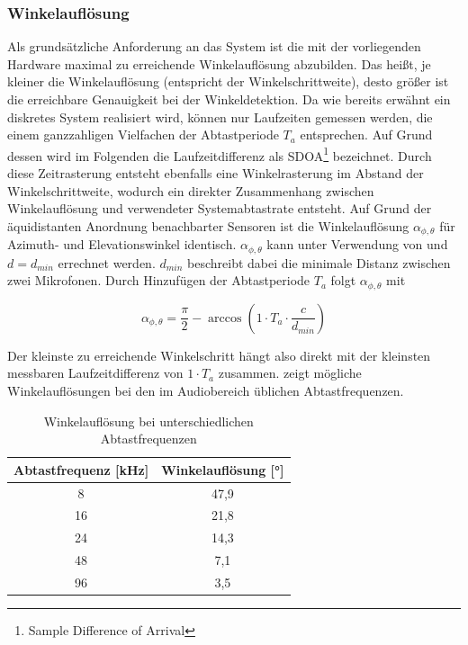\subsubsection{Winkelauflösung}
\label{subsubsec:Winkelaufloesung}
Als grundsätzliche Anforderung an das System ist die mit der vorliegenden Hardware maximal zu erreichende Winkelauflösung abzubilden. Das heißt, je kleiner die Winkelauflösung (entspricht der Winkelschrittweite), desto größer ist die erreichbare Genauigkeit bei der Winkeldetektion. Da wie bereits erwähnt ein diskretes System realisiert wird, können nur Laufzeiten gemessen werden, die einem ganzzahligen Vielfachen der Abtastperiode $T_a$ entsprechen. Auf Grund dessen wird im Folgenden die Laufzeitdifferenz als SDOA\footnote{Sample Difference of Arrival} bezeichnet. Durch diese Zeitrasterung entsteht ebenfalls eine Winkelrasterung im Abstand der Winkelschrittweite, wodurch ein direkter Zusammenhang zwischen Winkelauflösung und verwendeter Systemabtastrate entsteht. Auf Grund der äquidistanten Anordnung benachbarter Sensoren ist die Winkelauflösung $\alpha_{\phi, \theta}$ für Azimuth- und Elevationswinkel identisch. $\alpha_{\phi, \theta}$ kann unter Verwendung von  und $d=d_{min}$ errechnet werden. $d_{min}$ beschreibt dabei die minimale Distanz zwischen zwei Mikrofonen. Durch Hinzufügen der Abtastperiode $T_a$ folgt $\alpha_{\phi, \theta}$ mit  


\begin{equation}
    \alpha_{\phi, \theta} = \frac{\pi}{2} - \arccos{\left( 1 \cdot T_a \cdot \frac{c}{d_{min}} \right)} 
\end{equation}

Der kleinste zu erreichende Winkelschritt hängt also direkt mit der kleinsten messbaren Laufzeitdifferenz von $1 \cdot T_a$ zusammen.  zeigt mögliche Winkelauflösungen bei den im Audiobereich üblichen Abtastfrequenzen.



\begin{table}[h]
     \center
     \begin{tabular}{cc}
     \hline
          Abtastfrequenz [kHz] & Winkelauflösung [°] \\
           \hline \hline
          8                    & 47,9      \\
          16                   & 21,8      \\
          24                   & 14,3      \\
          48                   & 7,1       \\
          96                   & 3,5       \\
         \hline
     \end{tabular}
  \caption{Winkelauflösung bei unterschiedlichen Abtastfrequenzen}
 \label{tab:Winkelaufloesung_Abtastfrequenz}
 \end{table}



